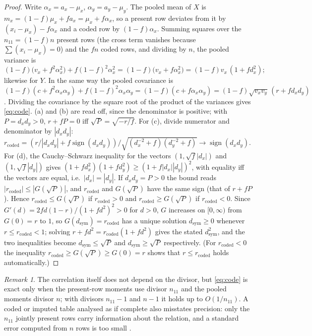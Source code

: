 \documentclass[11pt]{article}
\theoremstyle{definition}\newtheorem{definition}[theorem]{Definition}
\theoremstyle{remark}\newtheorem{remark}[theorem]{Remark}
\begin{document}
\begin{proof}
Write $\alpha_x=a_x-\mu_x$, $\alpha_y=a_y-\mu_y$. The pooled mean of $X$ is $m_x=(1-f)\mu_x+fa_x=\mu_x+f\alpha_x$, so a present row deviates from it by $(x_i-\mu_x)-f\alpha_x$ and a coded row by $(1-f)\alpha_x$. Summing squares over the $n_{11}=(1-f)n$ present rows (the cross term vanishes because $\sum(x_i-\mu_x)=0$) and the $fn$ coded rows, and dividing by $n$, the pooled variance is
\[
(1-f)\bigl(v_x+f^2\alpha_x^2\bigr)+f(1-f)^2\alpha_x^2=(1-f)\bigl(v_x+f\alpha_x^2\bigr)=(1-f)v_x\,(1+fd_x^2);
\]
likewise for $Y$. In the same way the pooled covariance is $(1-f)(c+f^2\alpha_x\alpha_y)+f(1-f)^2\alpha_x\alpha_y=(1-f)(c+f\alpha_x\alpha_y)=(1-f)\sqrt{v_xv_y}\,(r+fd_xd_y)$. Dividing the covariance by the square root of the product of the variances gives \eqref{eq:code}. (a) and (b) are read off, since the denominator is positive; with $P=d_xd_y>0$, $r+fP=0$ iff $\sqrt P=\sqrt{-r/f}$. For (c), divide numerator and denominator by $|d_xd_y|$: $r_{\mathrm{coded}}=(r/|d_xd_y|+f\operatorname{sign}(d_xd_y))/\sqrt{(d_x^{-2}+f)(d_y^{-2}+f)}\to\operatorname{sign}(d_xd_y)$. For (d), the Cauchy--Schwarz inequality for the vectors $(1,\sqrt f|d_x|)$ and $(1,\sqrt f|d_y|)$ gives $(1+fd_x^2)(1+fd_y^2)\ge(1+f|d_x||d_y|)^2$, with equality iff the vectors are equal, i.e.\ $|d_x|=|d_y|$. If $d_xd_y=P>0$ the bound reads $|r_{\mathrm{coded}}|\le|G(\sqrt P)|$, and $r_{\mathrm{coded}}$ and $G(\sqrt P)$ have the same sign (that of $r+fP$). Hence $r_{\mathrm{coded}}\le G(\sqrt P)$ if $r_{\mathrm{coded}}>0$ and $r_{\mathrm{coded}}\ge G(\sqrt P)$ if $r_{\mathrm{coded}}<0$. Since $G'(d)=2fd(1-r)/(1+fd^2)^2>0$ for $d>0$, $G$ increases on $[0,\infty)$ from $G(0)=r$ to $1$, so $G(d_{\mathrm{sym}})=r_{\mathrm{coded}}$ has a unique solution $d_{\mathrm{sym}}\ge0$ whenever $r\le r_{\mathrm{coded}}<1$; solving $r+fd^2=r_{\mathrm{coded}}(1+fd^2)$ gives the stated $d_{\mathrm{sym}}^2$, and the two inequalities become $d_{\mathrm{sym}}\le\sqrt P$ and $d_{\mathrm{sym}}\ge\sqrt P$ respectively. (For $r_{\mathrm{coded}}<0$ the inequality $r_{\mathrm{coded}}\ge G(\sqrt P)\ge G(0)=r$ shows that $r\le r_{\mathrm{coded}}$ holds automatically.)
\end{proof}

\begin{remark}
The correlation itself does not depend on the divisor, but \eqref{eq:code} is exact only when the present-row moments use divisor $n_{11}$ and the pooled moments divisor $n$; with divisors $n_{11}-1$ and $n-1$ it holds up to $O(1/n_{11})$. A coded or imputed table analysed as if complete also misstates precision: only the $n_{11}$ jointly present rows carry information about the relation, and a standard error computed from $n$ rows is too small \cite{LittleRubin,SchaferGraham}.
\end{remark}
\end{document}
